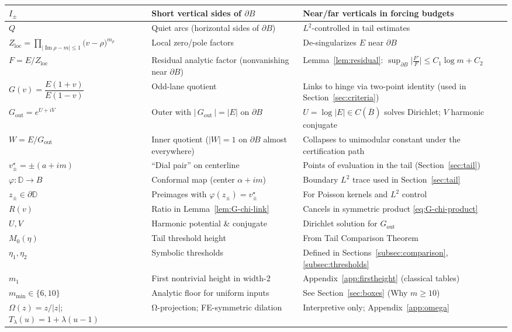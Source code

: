 \documentclass[11pt]{article}
\numberwithin{equation}{section}
\theoremstyle{remark}
\newcommand{\D}{\mathbb{D}}
\DeclareMathOperator{\Imag}{Im}
\newcommand{\Gout}{G_{\mathrm{out}}}
\newcommand{\Zloc}{Z_{\mathrm{loc}}}
\begin{document}
\begin{tabularx}{\textwidth}{|p{3.0cm}|L|L|}
\hline
$I_\pm$ & Short vertical sides of $\partial B$ & Near/far verticals in forcing budgets\\
\hline
$Q$ & Quiet arcs (horizontal sides of $\partial B$) & $L^2$-controlled in tail estimates\\
\hline
$\Zloc=\displaystyle\prod_{|\Imag\rho-m|\le 1}\bigl(v-\rho\bigr)^{m_\rho}$ & Local zero/pole factors & De-singularizes $E$ near $\partial B$\\
\hline
$F=E/\Zloc$ & Residual analytic factor (nonvanishing near $\partial B$) & Lemma~\ref{lem:residual}: $\sup_{\partial B}\big|\frac{F'}{F}\big|\le C_1\log m+C_2$\\
\hline
$G(v)=\dfrac{E(1+v)}{E(1-v)}$ & Odd-lane quotient & Links to hinge via two-point identity (used in Section~\ref{sec:criteria})\\
\hline
$\Gout=e^{U+iV}$ & Outer with $|\,\Gout\,|=|E|$ on $\partial B$ & $U=\log|E|\in C(\overline B)$ solves Dirichlet; $V$ harmonic conjugate\\
\hline
$W=E/\Gout$ & Inner quotient ($|W|=1$ on $\partial B$ almost everywhere) & Collapses to unimodular constant under the certification path\\
\hline
$v_\pm^\star=\pm(a+im)$ & “Dial pair” on centerline & Points of evaluation in the tail (Section~\ref{sec:tail})\\
\hline
$\varphi:\D\to B$ & Conformal map (center $\alpha+im$) & Boundary $L^2$ trace used in Section~\ref{sec:tail}\\
\hline
$z_\pm\in\partial\D$ & Preimages with $\varphi(z_\pm)=v_\pm^\star$ & For Poisson kernels and $L^2$ control\\
\hline
$R(v)$ & Ratio in Lemma~\ref{lem:G-chi-link} & Cancels in symmetric product \eqref{eq:G-chi-product}\\
\hline
$U,V$ & Harmonic potential \& conjugate & Dirichlet solution for $\Gout$\\
\hline
$M_0(\eta)$ & Tail threshold height & From Tail Comparison Theorem\\
\hline
$\eta_1,\eta_2$ & Symbolic thresholds & Defined in Sections~\ref{subsec:comparison}, \ref{subsec:thresholds}\\
\hline
$m_1$ & First nontrivial height in width-2 & Appendix~\ref{app:firstheight} (classical tables)\\
\hline
$m_{\min}\in\{6,10\}$ & Analytic floor for uniform inputs & See Section~\ref{sec:boxes} (Why $m\ge10$)\\
\hline
$\Omega(z)=z/|z|$; $T_\lambda(u)=1+\lambda(u-1)$ & Ω-projection; FE-symmetric dilation & Interpretive only; Appendix~\ref{app:omega}\\

\end{tabularx}
\end{document}
